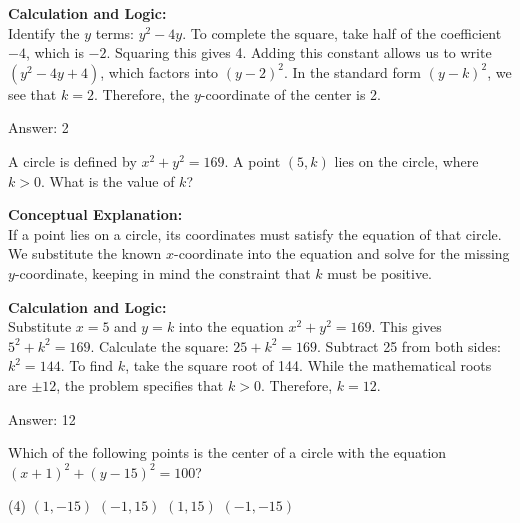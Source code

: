 \documentclass[11pt,paper=a4,answers]{exam}
\begin{document}
\begin{questions}
\begin{solution}
\vspace{30pt}

\textbf{Calculation and Logic:} \\
Identify the $y$ terms: $y^2 - 4y$. To complete the square, take half of the coefficient $-4$, which is $-2$. Squaring this gives 4. Adding this constant allows us to write $(y^2 - 4y + 4)$, which factors into $(y - 2)^2$. In the standard form $(y - k)^2$, we see that $k = 2$. Therefore, the $y$-coordinate of the center is 2.

\vspace{30pt}

Answer: \colorbox{yellow!100}{2}
\end{solution}

\vspace{60pt}

\question
A circle is defined by $x^2 + y^2 = 169$. A point $(5, k)$ lies on the circle, where $k > 0$. What is the value of $k$?

\begin{solution}
\textbf{Conceptual Explanation:} \\
If a point lies on a circle, its coordinates must satisfy the equation of that circle. We substitute the known $x$-coordinate into the equation and solve for the missing $y$-coordinate, keeping in mind the constraint that $k$ must be positive.

\vspace{30pt}

\textbf{Calculation and Logic:} \\
Substitute $x = 5$ and $y = k$ into the equation $x^2 + y^2 = 169$. This gives $5^2 + k^2 = 169$. Calculate the square: $25 + k^2 = 169$. Subtract 25 from both sides: $k^2 = 144$. To find $k$, take the square root of 144. While the mathematical roots are $\pm 12$, the problem specifies that $k > 0$. Therefore, $k = 12$.

\vspace{30pt}

Answer: \colorbox{yellow!100}{12}
\end{solution}

\vspace{60pt}

\question
Which of the following points is the center of a circle with the equation $(x + 1)^2 + (y - 15)^2 = 100$?
\begin{tasks}(4)
    \task $(1, -15)$
    \task $(-1, 15)$
    \task $(1, 15)$
    \task $(-1, -15)$
\end{tasks}


\end{questions}
\end{document}

